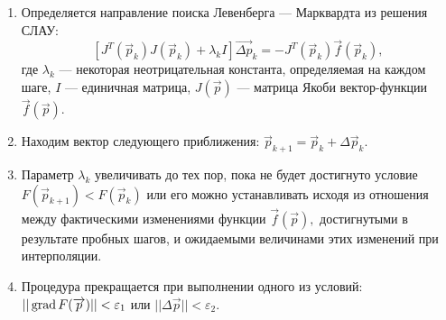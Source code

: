\begin{enumerate}
	\item Определяется направление поиска Левенберга — Марквардта  из решения СЛАУ: 
	$$[J^{T}({\vec {p}}_{k})J({\vec {p}}_{k})+\lambda _{k}I]{\vec {\Delta p}}_{k}=-J^{T}({\vec {p}}_{k}){\vec {f}}({\vec {p}}_{k}),$$
	где $\lambda _{k}$ — некоторая неотрицательная константа, определяемая на каждом шаге, $I$ — единичная матрица, $J({\vec {p}})$ — матрица Якоби вектор-функции ${\vec {f}}({\vec {p}})$. 
	\item Находим вектор следующего приближения: $\vec {p}_{k+1}={\vec {p}}_{k}+{\Delta \vec {p}}_{k}.$
	\item Параметр $\lambda _{k}$  увеличивать до тех пор, пока не будет достигнуто условие $F({\vec {p}}_{k+1})<F({\vec {p}}_{k})$ или его можно устанавливать исходя из отношения между фактическими изменениями функции ${\vec {f}}({\vec {p}}),$ достигнутыми в результате пробных шагов, и ожидаемыми величинами этих изменений при интерполяции.
	\item Процедура прекращается при выполнении одного из условий: $|| \, \mathrm{grad} \, F(\overrightarrow{p})|| < \varepsilon_1$ или $|| \Delta \overrightarrow{p}|| < \varepsilon_2$.
	
\end{enumerate}